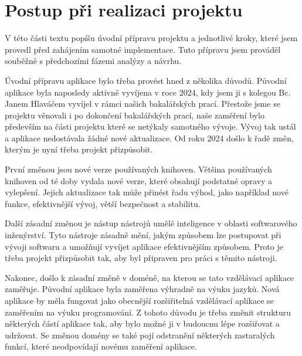 \section{Postup při realizaci projektu}


V této části textu popíšu úvodní přípravu projektu a jednotlivé kroky, které jsem provedl před zahájením samotné implementace. Tuto přípravu jsem prováděl souběžně s předchozími fázemi analýzy a návrhu.

Úvodní přípravu aplikace bylo třeba provést hned z několika důvodů. Původní aplikace byla naposledy aktivně vyvíjena v roce 2024, kdy jsem ji s kolegou Bc. Janem Hlaváčem vyvíjel v rámci našich bakalářských prací. Přestože jsme se projektu věnovali i po dokončení bakalářských prací, naše zaměření bylo především na části projektu které se netýkaly samotného vývoje. Vývoj tak ustál a aplikace nedostávala žádné nové aktualizace. Od roku 2024 došlo k řadě změn, kterým je nyní třeba projekt přizpůsobit. 

První změnou jsou nové verze používaných knihoven. Většina používaných knihoven od té doby vydala nové verze, které obsahují podstatné opravy a vylepšení. Jejich aktualizace tak může přinést řadu výhod, jako například nové funkce, efektivnější vývoj, větší bezpečnost a stabilitu.

Další zásadní změnou je nástup nástrojů umělé inteligence v oblasti softwarového inženýrství. Tyto nástroje zásadně mění, jakým způsobem lze postupovat při vývoji softwaru a umožňují vyvíjet aplikace efektivnějším způsobem. Proto je třeba projekt přizpůsobit tak, aby byl připraven pro práci s těmito nástroji. %

Nakonec, došlo k zásadní změně v doméně, na kterou se tato vzdělávací aplikace zaměřuje. Původní aplikace byla zaměřena výhradně na výuku jazyků. Nová aplikace by měla fungovat jako obecnější rozšiřitelná vzdělávací aplikace se zaměřením na výuku programování. Z tohoto důvodu je třeba změnit strukturu některých částí aplikace tak, aby bylo možné ji v budoucnu lépe rozšiřovat a udržovat. Se změnou domény se také pojí odstranění některých zastaralých funkcí, které neodpovídají novému zaměření aplikace.


